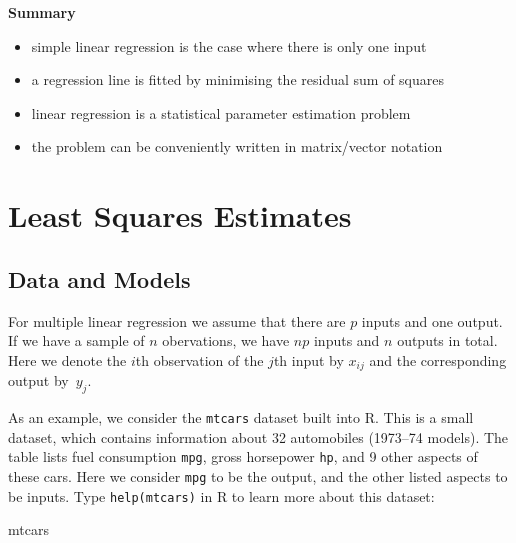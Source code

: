 \documentclass[
  a4paper,
]{article}
\newenvironment{Shaded}{\begin{snugshade}}{\end{snugshade}}
\newcommand{\NormalTok}[1]{#1}
\providecommand{\tightlist}{%
  \setlength{\itemsep}{0pt}\setlength{\parskip}{0pt}}
\theoremstyle{definition}
\theoremstyle{definition}
\theoremstyle{definition}
\theoremstyle{definition}
\theoremstyle{remark}
\begin{document}
\textbf{Summary}

\begin{itemize}
\tightlist
\item
  simple linear regression is the case where there is only one input
\item
  a regression line is fitted by minimising the residual sum of squares
\item
  linear regression is a statistical parameter estimation problem
\item
  the problem can be conveniently written in matrix/vector notation
\end{itemize}

\clearpage

\hypertarget{S02-multiple}{%
\section{Least Squares Estimates}\label{S02-multiple}}

\hypertarget{data-and-models}{%
\subsection{Data and Models}\label{data-and-models}}

For multiple linear regression we assume that there are \(p\) inputs and
one output. If we have a sample of \(n\) obervations, we have \(np\)
inputs and \(n\) outputs in total. Here we denote the \(i\)th observation
of the \(j\)th input by \(x_{ij}\) and the corresponding output by~\(y_j\).

As an example, we consider the \texttt{mtcars} dataset built into R. This is
a small dataset, which contains information about 32 automobiles
(1973--74 models). The table lists fuel consumption \texttt{mpg}, gross horsepower \texttt{hp},
and 9 other aspects of these cars. Here we consider \texttt{mpg} to be the output,
and the other listed aspects to be inputs. Type \texttt{help(mtcars)} in R to learn
more about this dataset:

\begin{Shaded}
\begin{Highlighting}[]
\NormalTok{mtcars}
\end{Highlighting}
\end{Shaded}
\end{document}
